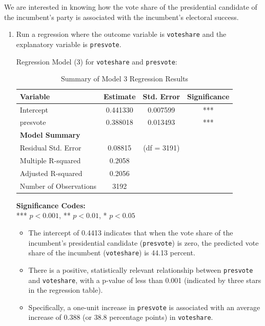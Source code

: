 \documentclass[12pt,letterpaper]{article}
\begin{document}
\noindent We are interested in knowing how the vote share of the presidential candidate of the incumbent's party is associated with the incumbent's electoral success.
\vspace{.25cm}
\noindent\begin{enumerate}[left=0pt]
		\item Run a regression where the outcome variable is \texttt{voteshare} and the explanatory variable is \texttt{presvote}.		

\vspace{0.5cm}	
\noindent Regression Model (3) for \texttt{voteshare} and \texttt{presvote}:
\noindent

\begin{table}[h!]
	\centering
	\caption{Summary of Model 3 Regression Results}
	\vspace{0.25cm}
	\begin{tabular}{lccc}
		\toprule
		\textbf{Variable} & \textbf{Estimate} & \textbf{Std. Error} & \textbf{Significance} \\ 
		\midrule
		Intercept              & 0.441330 & 0.007599 & *** \\ 
		presvote               & 0.388018 & 0.013493 & *** \\ 
		\midrule
		\textbf{Model Summary} & & & \\
		Residual Std. Error    & 0.08815  & (df = 3191) & \\ 
		Multiple R-squared     & 0.2058   & & \\ 
		Adjusted R-squared     & 0.2056   & & \\ 
		Number of Observations & 3192     & & \\ 
		\bottomrule
	\end{tabular}
\end{table}

\vspace{0.1cm}
\noindent\textbf{Significance Codes:} \\
*** $p < 0.001$, ** $p < 0.01$, * $p < 0.05$

\vspace{0.5cm} \begin{itemize}[left=0pt, label=\textbullet]
	\item The intercept of 0.4413 indicates that when the vote share of the incumbent’s presidential candidate (\texttt{presvote}) is zero, the predicted vote share of the incumbent (\texttt{voteshare}) is 44.13 percent.
	
	\item There is a positive, statistically relevant relationship between \texttt{presvote} and \texttt{voteshare}, with a p-value of less than 0.001 (indicated by three stars in the regression table).
	
	\item Specifically, a one-unit increase in \texttt{presvote} is associated with an average increase of 0.388 (or 38.8 percentage points) in \texttt{voteshare}.
\end{itemize}

\end{enumerate}
\end{document}
